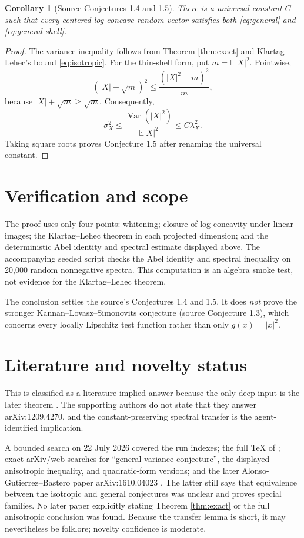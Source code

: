 \documentclass[11pt]{article}
\newtheorem{corollary}[theorem]{Corollary}
\newcommand{\E}{\mathbb E}
\newcommand{\Var}{\operatorname{Var}}
\begin{document}
\begin{corollary}[Source Conjectures 1.4 and 1.5]\label{cor:source}
There is a universal constant $C$ such that every centered log-concave random
vector satisfies both \eqref{eq:general} and \eqref{eq:general-shell}.
\end{corollary}

\begin{proof}
The variance inequality follows from Theorem \ref{thm:exact} and
Klartag--Lehec's bound \eqref{eq:isotropic}. For the thin-shell form, put
$m=\E|X|^2$. Pointwise,
\[
 (|X|-\sqrt m)^2
 \leq \frac{(|X|^2-m)^2}{m},
\]
because $|X|+\sqrt m\geq\sqrt m$. Consequently,
\[
 \sigma_X^2\leq\frac{\Var(|X|^2)}{\E|X|^2}
 \leq C\lambda_X^2.
\]
Taking square roots proves Conjecture 1.5 after renaming the universal
constant.
\end{proof}

\section{Verification and scope}

The proof uses only four points: whitening; closure of log-concavity under
linear images; the Klartag--Lehec theorem in each projected dimension; and the
deterministic Abel identity and spectral estimate displayed above. The accompanying
seeded script checks the Abel identity and spectral inequality on 20,000 random
nonnegative spectra. This computation is an algebra smoke test, not evidence
for the Klartag--Lehec theorem.

The conclusion settles the source's Conjectures 1.4 and 1.5. It does
\emph{not} prove the stronger Kannan--Lovasz--Simonovits conjecture (source
Conjecture 1.3), which concerns every locally Lipschitz test function rather
than only $g(x)=|x|^2$.

\section{Literature and novelty status}

This is classified as a literature-implied answer because the only deep input
is the later theorem \cite{KL}. The supporting authors do not state that they
answer arXiv:1209.4270, and the constant-preserving spectral transfer is the
agent-identified implication.

A bounded search on 22 July 2026 covered the run indexes; the full TeX of
\cite{KL}; exact arXiv/web searches for ``general variance conjecture'', the
displayed anisotropic inequality, and quadratic-form versions; and the later
Alonso-Gutierrez--Bastero paper arXiv:1610.04023 \cite{ABlater}. The latter
still says that equivalence between the isotropic and general conjectures was
unclear and proves special families. No later paper explicitly stating
Theorem \ref{thm:exact} or the full anisotropic conclusion was found. Because
the transfer lemma is short, it may nevertheless be folklore; novelty
confidence is moderate.
\end{document}
